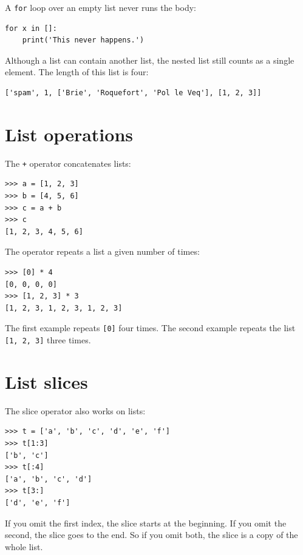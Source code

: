 \documentclass[10pt]{book}
\begin{document}
A {\tt for} loop over an empty list never runs the body:

\begin{verbatim}
for x in []:
    print('This never happens.')
\end{verbatim}
%
Although a list can contain another list, the nested
list still counts as a single element.  The length of this list is
four:

\begin{verbatim}
['spam', 1, ['Brie', 'Roquefort', 'Pol le Veq'], [1, 2, 3]]
\end{verbatim}



\section{List operations}

The {\tt +} operator concatenates lists:

\begin{verbatim}
>>> a = [1, 2, 3]
>>> b = [4, 5, 6]
>>> c = a + b
>>> c
[1, 2, 3, 4, 5, 6]
\end{verbatim}
%
The {\tt *} operator repeats a list a given number of times:

\begin{verbatim}
>>> [0] * 4
[0, 0, 0, 0]
>>> [1, 2, 3] * 3
[1, 2, 3, 1, 2, 3, 1, 2, 3]
\end{verbatim}
%
The first example repeats {\tt [0]} four times.  The second example
repeats the list {\tt [1, 2, 3]} three times.


\section{List slices}

The slice operator also works on lists:

\begin{verbatim}
>>> t = ['a', 'b', 'c', 'd', 'e', 'f']
>>> t[1:3]
['b', 'c']
>>> t[:4]
['a', 'b', 'c', 'd']
>>> t[3:]
['d', 'e', 'f']
\end{verbatim}
%
If you omit the first index, the slice starts at the beginning.
If you omit the second, the slice goes to the end.  So if you
omit both, the slice is a copy of the whole list.
\end{document}
